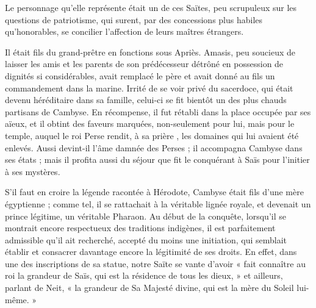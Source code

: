 \documentclass[a4paper, 11pt, oneside]{article}
\begin{document}
Le personnage qu'elle représente était un de ces Saïtes, peu scrupuleux sur les questions de patriotisme, qui surent, par des concessions plus habiles qu'honorables, se concilier l'affection de leurs maîtres étrangers.

Il était fils du grand-prêtre en fonctions sous Apriès. Amasis, peu soucieux de laisser les amis et les parents de son prédécesseur détrôné en possession de dignités si considérables, avait remplacé le père et avait donné au fils un commandement dans la marine. Irrité de se voir privé du sacerdoce, qui était devenu héréditaire dans sa famille, celui-ci se fit bientôt un des plus chauds partisans de Cambyse. En récompense, il fut rétabli dans la place occupée par ses aïeux, et il obtint des faveurs marquées, non-seulement pour lui, mais pour le temple, auquel le roi Perse rendit, à sa prière , les domaines qui lui avaient été enlevés. Aussi devint-il l'âme damnée des Perses ; il accompagna Cambyse dans ses états ; mais il profita aussi du séjour que fit le conquérant à Saïs pour l'initier à ses mystères.

S'il faut en croire la légende racontée à Hérodote, Cambyse était fils d'une mère égyptienne ; comme tel, il se rattachait à la véritable lignée royale, et devenait un prince légitime, un véritable Pharaon. Au début de la conquête, lorsqu'il se montrait encore respectueux des traditions indigènes, il est parfaitement admissible qu'il ait recherché, accepté du moins une initiation, qui semblait établir et consacrer davantage encore la légitimité de ses droits. En effet, dans une des inscriptions de sa statue, notre Saïte se vante d'avoir « fait connaître au roi la grandeur de Saïs, qui est la résidence de tous les dieux, » et ailleurs, parlant de Neit, « la grandeur de Sa Majesté divine, qui est la mère du Soleil lui-même. »
\end{document}
